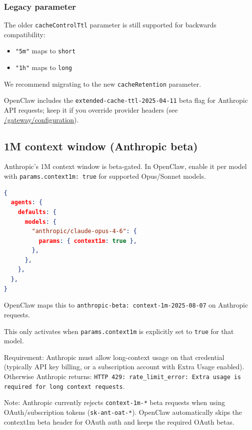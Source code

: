 \subsubsection{Legacy parameter}


The older \texttt{cacheControlTtl} parameter is still supported for backwards compatibility:

\begin{itemize}
  \item \texttt{"5m"} maps to \texttt{short}
  \item \texttt{"1h"} maps to \texttt{long}
\end{itemize}


We recommend migrating to the new \texttt{cacheRetention} parameter.

OpenClaw includes the \texttt{extended-cache-ttl-2025-04-11} beta flag for Anthropic API
requests; keep it if you override provider headers (see \href{/gateway/configuration}{/gateway/configuration}).

\subsection{1M context window (Anthropic beta)}


Anthropic's 1M context window is beta-gated. In OpenClaw, enable it per model
with \texttt{params.context1m: true} for supported Opus/Sonnet models.

\begin{lstlisting}[language=json]
{
  agents: {
    defaults: {
      models: {
        "anthropic/claude-opus-4-6": {
          params: { context1m: true },
        },
      },
    },
  },
}
\end{lstlisting}


OpenClaw maps this to \texttt{anthropic-beta: context-1m-2025-08-07} on Anthropic
requests.

This only activates when \texttt{params.context1m} is explicitly set to \texttt{true} for
that model.

Requirement: Anthropic must allow long-context usage on that credential
(typically API key billing, or a subscription account with Extra Usage
enabled). Otherwise Anthropic returns:
\texttt{HTTP 429: rate\_limit\_error: Extra usage is required for long context requests}.

Note: Anthropic currently rejects \texttt{context-1m-*} beta requests when using
OAuth/subscription tokens (\texttt{sk-ant-oat-*}). OpenClaw automatically skips the
context1m beta header for OAuth auth and keeps the required OAuth betas.

